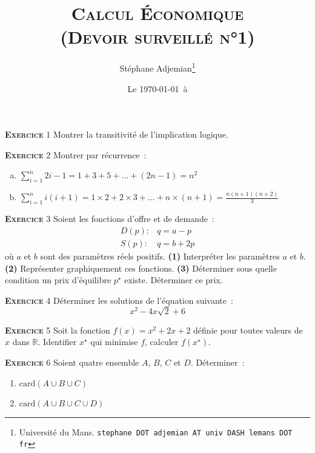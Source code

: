 \documentclass[10pt,a4paper,notitlepage]{article}
\newcommand{\exercice}[1]{\textsc{\textbf{Exercice}} #1}
\begin{document}
\title{\textsc{Calcul Économique\\ \small{(Devoir surveillé n°1)}}}
\author{Stéphane Adjemian\thanks{Université du Mans. \texttt{stephane DOT adjemian AT univ DASH lemans DOT fr}}}
\date{Le \today\ à \thistime}

\maketitle


\exercice{1} Montrer la transitivité de l'implication logique.

\bigskip

\exercice{2} Montrer par récurrence :
\begin{enumerate}[(a)]
\item $\sum_{i=1}^n 2i-1 = 1+3+5+\dots+(2n-1)= n^2$
\item $\sum_{i=1}^n i(i+1) = 1\times2 + 2\times 3 + \dots +
  n\times(n+1) = \frac{n(n+1)(n+2)}{3}$ 
\end{enumerate}

\bigskip

\exercice{3} Soient les fonctions d'offre et de demande :
\[
\begin{split}
  D(p):& q = a - p\\
  S(p):& q = b + 2p
\end{split}
\] 
où $a$ et $b$ sont des paramètres réels positifs. \textbf{(1)} Interpréter les
paramètres $a$ et $b$. \textbf{(2)} Représenter graphiquement ces
fonctions. \textbf{(3)} Déterminer sous quelle condition un prix d'équilibre
$p^{\star}$ existe. Déterminer ce prix.

\bigskip

\exercice{4} Déterminer les solutions de l'équation suivante :
\[
x^2 - 4x\sqrt{2} + 6
\]

\bigskip

\exercice{5} 
Soit la fonction $f(x) = x^2+2x+2$ définie pour toutes valeurs de $x$
dans $\mathbb R$. Identifier $x^{\star}$ qui minimise $f$, calculer $f(x^{\star})$.

\bigskip

\exercice{6} Soient quatre ensemble $A$, $B$, $C$ et $D$. Déterminer :
\begin{enumerate}
\item $\mathrm{card}(A \cup B \cup C)$
\item $\mathrm{card}(A \cup B \cup C \cup D)$
\end{enumerate}
\end{document}
